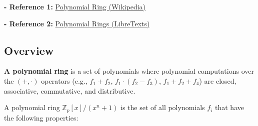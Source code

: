 \textbf{- Reference 1:} 
\href{https://en.wikipedia.org/wiki/Polynomial_ring}{Polynomial Ring (Wikipedia)}~\cite{polynomial-ring}

\noindent \textbf{- Reference 2:} 
\href{https://math.libretexts.org/Bookshelves/Combinatorics_and_Discrete_Mathematics/Applied_Discrete_Structures_(Doerr_and_Levasseur)/16%3A_An_Introduction_to_Rings_and_Fields/16.03%3A_Polynomial_Rings}{Polynomial Rings (LibreTexts)}~\cite{polynomial-rings}

\subsection{Overview}
\label{subsec:poly-ring-overview}

\textbf{A polynomial ring} is a set of polynomials where polynomial computations over the $(+, \cdot)$ operators (e.g., $f_1 + f_2$, $f_1 \cdot (f_2 - f_3)$, $f_1 + f_2 + f_4$) are closed, associative, commutative, and distributive. 


A polynomial ring ${\mathbb{Z}_p[x] / (x^n + 1)}$ is the set of all polynomials $f_i$ that have the following properties:

